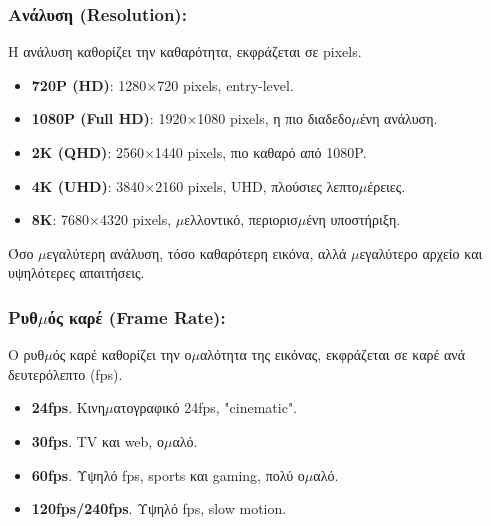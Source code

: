 


\subsubsection*{Ανάλυση (Resolution):}

Η ανάλυση καθορίζει την καθαρότητα, εκφράζεται σε pixels.

\begin{itemize}
  \item \textbf{720P (HD)}: 1280×720 pixels, entry-level.
  \item \textbf{1080P (Full HD)}: 1920×1080 pixels, η πιο διαδεδο$\mu$ένη ανάλυση.
  \item \textbf{2K (QHD)}: 2560×1440 pixels, πιο καθαρό από 1080P.
  \item \textbf{4K (UHD)}: 3840×2160 pixels, UHD, πλούσιες λεπτο$\mu$έρειες.
  \item \textbf{8K}: 7680×4320 pixels, $\mu$ελλοντικό, περιορισ$\mu$ένη υποστήριξη.
\end{itemize}

Όσο $\mu$εγαλύτερη ανάλυση, τόσο καθαρότερη εικόνα, αλλά $\mu$εγαλύτερο αρχείο και υψηλότερες απαιτήσεις.

\subsubsection*{Ρυθ$\mu$ός καρέ (Frame Rate):}

Ο ρυθ$\mu$ός καρέ καθορίζει την ο$\mu$αλότητα της εικόνας, εκφράζεται σε καρέ ανά δευτερόλεπτο (fps).

\begin{itemize}
  \item \textbf{24fps}. Κινη$\mu$ατογραφικό 24fps, "cinematic".
  \item \textbf{30fps}. TV και web, ο$\mu$αλό.
  \item \textbf{60fps}. Υψηλό fps, sports και gaming, πολύ ο$\mu$αλό.
  \item \textbf{120fps/240fps}. Υψηλό fps, slow motion.
\end{itemize}

